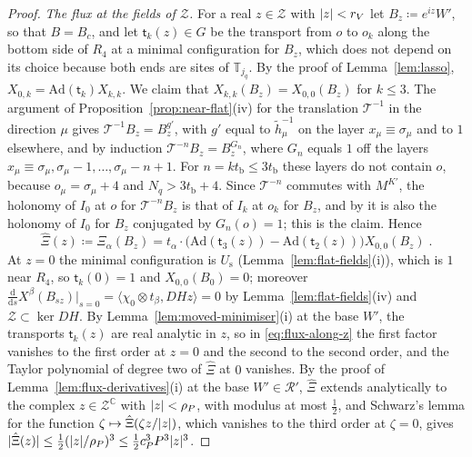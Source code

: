 \documentclass[11pt]{preprint}
\newcommand{\dd}{\mathrm{d}}
\DeclarePairedDelimiter{\abs}{\lvert}{\rvert}
\numberwithin{equation}{section}
\theoremstyle{definition}
\theoremstyle{remark}
\theoremstyle{plain}
\begin{document}
\begin{proof}
\emph{The flux at the fields of $\mathcal Z$.} For a real $z \in \mathcal Z$ with $\abs z < r_V$ let $B_z \coloneqq e^{iz}W'$, so that $B = B_c$, and let $\mathsf t_k(z) \in G$ be the transport from $o$ to $o_k$ along the bottom side of $R_4$ at a minimal configuration for $B_z$, which does not depend on its choice because both ends are sites of $\mathbb T_{j_q}$. By the proof of Lemma~\ref{lem:lasso}, $X_{0,k} = \mathrm{Ad}(\mathsf t_k)X_{k,k}$. We claim that $X_{k,k}(B_z) = X_{0,0}(B_z)$ for $k \leq 3$. The argument of Proposition~\ref{prop:near-flat}(iv) for the translation $\mathcal T^{-1}$ in the direction $\mu$ gives $\mathcal T^{-1}B_z = B_z^{g'}$, with $g'$ equal to $\tilde h_\mu^{-1}$ on the layer $x_\mu \equiv \sigma_\mu$ and to $1$ elsewhere, and by induction $\mathcal T^{-n}B_z = B_z^{G_n}$, where $G_n$ equals $1$ off the layers $x_\mu \equiv \sigma_\mu, \sigma_\mu - 1, \dots, \sigma_\mu - n + 1$. For $n = kt_{\mathrm b} \leq 3t_{\mathrm b}$ these layers do not contain $o$, because $o_\mu = \sigma_\mu + 4$ and $N_q > 3t_{\mathrm b} + 4$. Since $\mathcal T^{-n}$ commutes with $M^{K'}$, the holonomy of $I_0$ at $o$ for $\mathcal T^{-n}B_z$ is that of $I_k$ at $o_k$ for $B_z$, and by \cite[(181), p.~307]{BalabanVAR} it is also the holonomy of $I_0$ for $B_z$ conjugated by $G_n(o) = 1$; this is the claim. Hence
\begin{equation}\label{eq:flux-along-z}
    \hat\Xi(z) \coloneqq \Xi_\alpha(B_z) = t_\alpha \cdot \bigl(\mathrm{Ad}(\mathsf t_3(z)) - \mathrm{Ad}(\mathsf t_2(z))\bigr)X_{0,0}(B_z)\;.
\end{equation}
At $z = 0$ the minimal configuration is $U_{\mathrm s}$ (Lemma~\ref{lem:flat-fields}(i)), which is $1$ near $R_4$, so $\mathsf t_k(0) = 1$ and $X_{0,0}(B_0) = 0$; moreover $\frac{\dd}{\dd s}X^\beta(B_{sz})|_{s=0} = \langle\chi_0 \otimes t_\beta, DHz\rangle = 0$ by Lemma~\ref{lem:flat-fields}(iv) and $\mathcal Z \subset \ker DH$. By Lemma~\ref{lem:moved-minimiser}(i) at the base $W'$, the transports $\mathsf t_k(z)$ are real analytic in $z$, so in \eqref{eq:flux-along-z} the first factor vanishes to the first order at $z = 0$ and the second to the second order, and the Taylor polynomial of degree two of $\hat\Xi$ at $0$ vanishes. By the proof of Lemma~\ref{lem:flux-derivatives}(i) at the base $W' \in \mathcal R'$, $\hat\Xi$ extends analytically to the complex $z \in \mathcal Z^{\mathbb C}$ with $\abs z < \rho_P$, with modulus at most $\frac12$, and Schwarz's lemma for the function $\zeta \mapsto \hat\Xi(\zeta z/\abs z)$, which vanishes to the third order at $\zeta = 0$, gives $\abs{\hat\Xi(z)} \leq \frac12(\abs z/\rho_P)^3 \leq \frac12c_P^3P^3\abs z^3$.


\end{proof}
\end{document}
